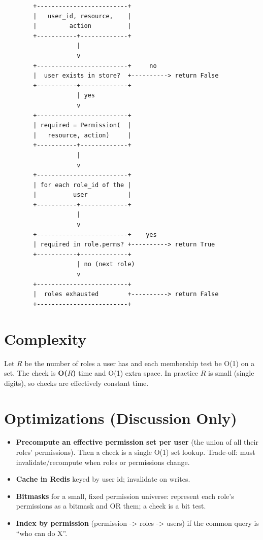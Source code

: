 \documentclass[11pt,a4paper]{report}
\begin{document}
\begin{verbatim}
        +-------------------------+
        |   user_id, resource,    |
        |         action          |
        +-----------+-------------+
                    |
                    v
        +-------------------------+     no
        |  user exists in store?  +----------> return False
        +-----------+-------------+
                    | yes
                    v
        +-------------------------+
        | required = Permission(  |
        |   resource, action)     |
        +-----------+-------------+
                    |
                    v
        +-------------------------+
        | for each role_id of the |
        |          user           |
        +-----------+-------------+
                    |
                    v
        +-------------------------+    yes
        | required in role.perms? +----------> return True
        +-----------+-------------+
                    | no (next role)
                    v
        +-------------------------+
        |  roles exhausted        +----------> return False
        +-------------------------+
\end{verbatim}

\section{Complexity}

Let $R$ be the number of roles a user has and each membership test be O(1) on a
set. The check is \textbf{O($R$)} time and O(1) extra space. In practice $R$ is
small (single digits), so checks are effectively constant time.

\section{Optimizations (Discussion Only)}

\begin{itemize}[leftmargin=1.4em]
  \item \textbf{Precompute an effective permission set per user} (the union of
        all their roles' permissions). Then a check is a single O(1) set lookup.
        Trade-off: must invalidate/recompute when roles or permissions change.
  \item \textbf{Cache in Redis} keyed by user id; invalidate on writes.
  \item \textbf{Bitmasks} for a small, fixed permission universe: represent each
        role's permissions as a bitmask and OR them; a check is a bit test.
  \item \textbf{Index by permission} (permission -> roles -> users) if the common
        query is ``who can do X''.
\end{itemize}
\end{document}
